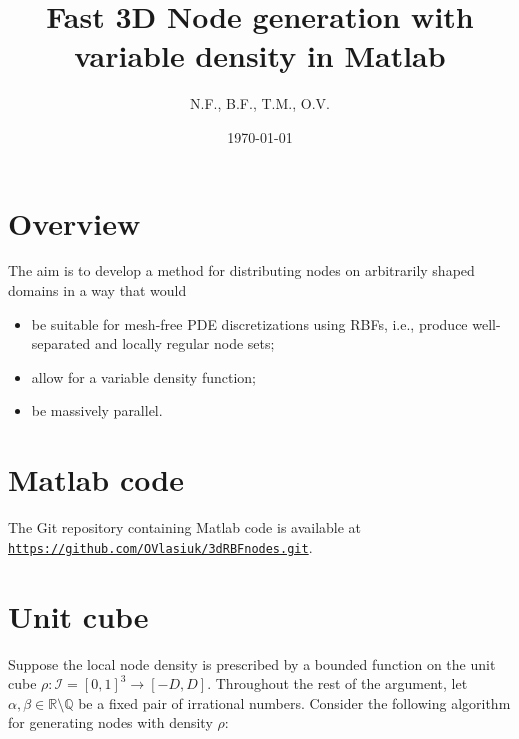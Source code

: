 \documentclass[10pt]{amsart}
\title{Fast 3D Node generation with variable density in Matlab}
\author{N.F., B.F., T.M., O.V.}
\date{\today}
\begin{document}
\maketitle

\section{Overview}

The aim is to develop a method for distributing nodes on arbitrarily shaped domains in a way that would 
\begin{itemize}
 \item be suitable for mesh-free PDE discretizations using RBFs, i.e., produce well-separated and locally regular node sets;
 \item allow for a variable density function;
 \item be massively parallel.
\end{itemize}

\section{Matlab code}

The Git repository containing Matlab code is available at  \texttt{\url{https://github.com/OVlasiuk/3dRBFnodes.git}}.

\section{Unit cube}

Suppose the local node density is prescribed by a bounded function on the unit cube  $\rho: \mathcal{I} =[0,1]^3 \to [-D,D]$. Throughout the rest of the argument, let $ \alpha, \beta\in\mathbb{R}\setminus\mathbb{Q} $ be a fixed pair of irrational numbers. Consider the following algorithm for generating nodes with density $ \rho $:  
\end{document}
